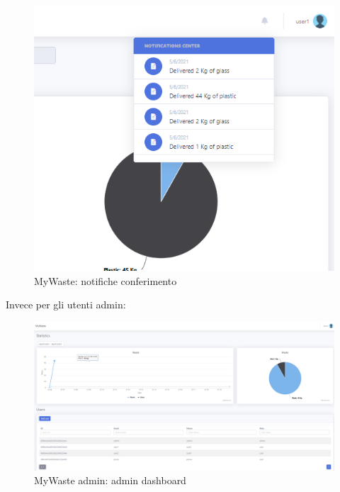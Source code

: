 \documentclass{report}
\begin{document}
\begin{figure}[h!]
    \begin{center}
        \includegraphics[width=1.0\textwidth]{images/notificheConferimento.PNG}  \end{center}
    \caption{MyWaste: notifiche conferimento}
    \label{fig: notify}
\end{figure}
Invece per gli utenti admin:
\begin{figure}[h!]
    \begin{center}
        \includegraphics[width=1.0\textwidth]{images/adminDashboard.PNG}  \end{center}
    \caption{MyWaste admin: admin dashboard}
    \label{fig: adminDashboard}
\end{figure}
\end{document}
